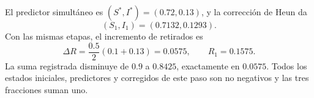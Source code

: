 El predictor simultáneo es \((S^*,I^*)=(0.72,0.13)\), y la corrección de Heun da
\[
(S_1,I_1)=(0.7132,0.1293).
\]
Con las mismas etapas, el incremento de retirados es
\[
\Delta R=\frac{0.5}{2}(0.1+0.13)=0.0575,
\qquad R_1=0.1575.
\]
La suma registrada disminuye de \(0.9\) a \(0.8425\), exactamente en \(0.0575\). Todos los estados iniciales, predictores y corregidos de este paso son no negativos y las tres fracciones suman uno.

